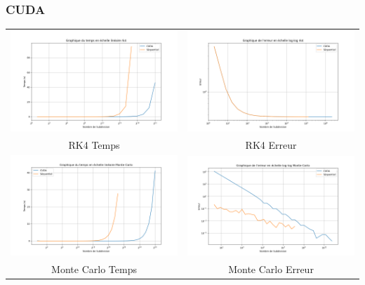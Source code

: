 \documentclass[10pt]{beamer}
\begin{document}
\begin{frame}
    \frametitle{CUDA}
        \small
    \begin{tabular}{cc}
         \includegraphics[width=0.45\linewidth]{Images/time_RK_cuda.png} &
         \includegraphics[width=0.45\linewidth]{Images/error_RK_cuda.png} \\
        RK4 Temps & RK4 Erreur\\
         \includegraphics[width=0.45\linewidth]{Images/time_monte_carlo_cuda.png} &
         \includegraphics[width=0.45\linewidth]{Images/error_monte_carlo_cuda.png} \\
        Monte Carlo Temps & Monte Carlo Erreur\\
    \end{tabular}
        
\end{frame}
\end{document}
